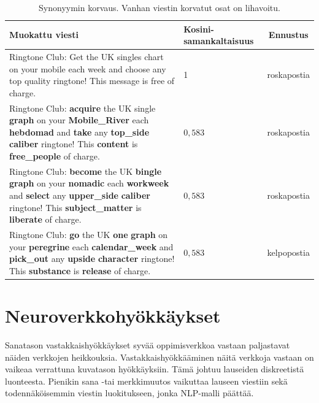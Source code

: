 \begin{table}[t]
  \begin{tabularx}{\textwidth}{| X | l | c |}
    \hline
    Muokattu viesti                                                                                                                                                                                                                                            & Kosini-saman\-kaltaisuus & Ennustus    \\
    \hline
    Ringtone Club: Get the UK singles chart on your mobile each week and choose any top quality ringtone! This message is free of charge.                                                                                                                      & 1                        & roskapostia \\
    \hline
    Ringtone Club: \textbf{acquire} the UK single \textbf{graph} on your \textbf{Mobile\_River} each \textbf{hebdomad} and \textbf{take} any \textbf{top\_side} \textbf{caliber} ringtone! This \textbf{content} is \textbf{free\_people} of charge.           & $0,583$                  & roskapostia \\
    \hline
    Ringtone Club: \textbf{become} the UK \textbf{bingle} \textbf{graph} on your \textbf{nomadic} each \textbf{workweek} and \textbf{select} any \textbf{upper\_side} \textbf{caliber} ringtone! This \textbf{subject\_matter} is \textbf{liberate} of charge. & $0,583$                  & roskapostia \\
    \hline
    Ringtone Club: \textbf{go} the UK \textbf{one} \textbf{graph} on your \textbf{peregrine} each \textbf{calendar\_week} and \textbf{pick\_out} any \textbf{upside} \textbf{character} ringtone! This \textbf{substance} is \textbf{release} of charge.       & $0,583$                  & kelpopostia \\
    \hline
  \end{tabularx}
  \caption{Synonyymin korvaus. Vanhan viestin korvatut osat on lihavoitu. \citep{spamfilter}}
\end{table}

\section{Neuroverkkohyökkäykset}
Sanatason vastakkaishyökkäykset syvää oppimisverkkoa vastaan paljastavat  näiden verkkojen heikkouksia. Vastakkaishyökkääminen näitä verkkoja vastaan on vaikeaa verrattuna kuvatason hyökkäyksiin. Tämä johtuu lauseiden diskreetistä luonteesta. Pienikin sana -tai merkkimuutos vaikuttaa lauseen viestiin sekä todennäköisemmin viestin luokitukseen, jonka NLP-malli päättää. \citep{neural}

